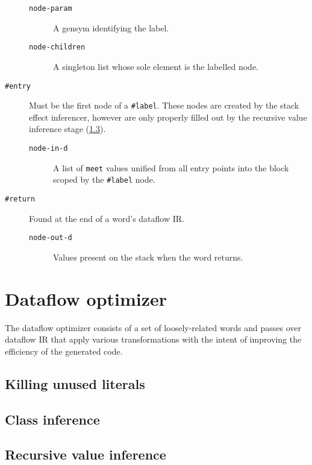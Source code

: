 \documentclass{book}
\begin{document}
\begin{description}
\begin{description}
\item[\texttt{node-param}]A gensym identifying the label.\\
\item[\texttt{node-children}]A singleton list whose sole element is the labelled node.
\end{description}

\item[\texttt{\#entry}] Must be the first node of a \verb|#label|. These nodes are created by the stack effect inferencer, however are only properly filled out by the recursive value inference stage (\ref{recursive-inference}).
\begin{description}
\item[\texttt{node-in-d}]A list of \verb|meet| values unified from all entry points into the block scoped by the \verb|#label| node.\\
\end{description}

\item[\texttt{\#return}] Found at the end of a word's dataflow IR.

\begin{description}
\item[\texttt{node-out-d}]Values present on the stack when the word returns.
\end{description}

\end{description}

\section{Dataflow optimizer}

The dataflow optimizer consists of a set of loosely-related words and passes over dataflow IR that apply various transformations with the intent of improving the efficiency of the generated code.

\subsection{Killing unused literals}

\subsection{Class inference}\label{class-inference}

\subsection{Recursive value inference}\label{recursive-inference}
\end{document}
